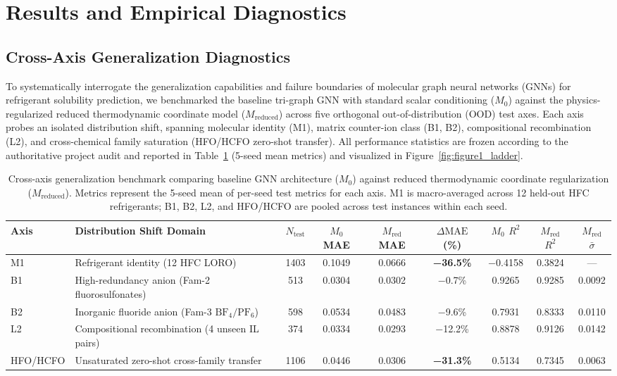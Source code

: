 \section{Results and Empirical Diagnostics}
\label{sec:results}

\subsection{Cross-Axis Generalization Diagnostics}
\label{subsec:cross_axis}

To systematically interrogate the generalization capabilities and failure boundaries of molecular graph neural networks (GNNs) for refrigerant solubility prediction, we benchmarked the baseline tri-graph GNN with standard scalar conditioning ($M_0$) against the physics-regularized reduced thermodynamic coordinate model ($M_{\mathrm{reduced}}$) across five orthogonal out-of-distribution (OOD) test axes. Each axis probes an isolated distribution shift, spanning molecular identity (M1), matrix counter-ion class (B1, B2), compositional recombination (L2), and cross-chemical family saturation (HFO/HCFO zero-shot transfer). All performance statistics are frozen according to the authoritative project audit and reported in Table~\ref{tab:cross_axis_master} (5-seed mean metrics) and visualized in Figure~\ref{fig:figure1_ladder}.

\begin{table}[htbp]
\centering
\small
\caption{Cross-axis generalization benchmark comparing baseline GNN architecture ($M_0$) against reduced thermodynamic coordinate regularization ($M_{\mathrm{reduced}}$). Metrics represent the 5-seed mean of per-seed test metrics for each axis. M1 is macro-averaged across 12 held-out HFC refrigerants; B1, B2, L2, and HFO/HCFO are pooled across test instances within each seed.}
\label{tab:cross_axis_master}
\begin{tabular}{llccccccc}
\toprule
\textbf{Axis} & \textbf{Distribution Shift Domain} & \textbf{$N_{\mathrm{test}}$} & \textbf{$M_0$ MAE} & \textbf{$M_{\mathrm{red}}$ MAE} & \textbf{$\Delta\text{MAE}$ (\%)} & \textbf{$M_0$ $R^2$} & \textbf{$M_{\mathrm{red}}$ $R^2$} & \textbf{$M_{\mathrm{red}}$ $\bar{\sigma}$} \\
\midrule
M1 & Refrigerant identity (12 HFC LORO) & 1403 & 0.1049 & 0.0666 & \textbf{−36.5\%} & −0.4158 & 0.3824 & — \\
B1 & High-redundancy anion (Fam-2 fluorosulfonates) & 513 & 0.0304 & 0.0302 & −0.7\% & 0.9265 & 0.9285 & 0.0092 \\
B2 & Inorganic fluoride anion (Fam-3 $\text{BF}_4/\text{PF}_6$) & 598 & 0.0534 & 0.0483 & −9.6\% & 0.7931 & 0.8333 & 0.0110 \\
L2 & Compositional recombination (4 unseen IL pairs) & 374 & 0.0334 & 0.0293 & −12.2\% & 0.8878 & 0.9126 & 0.0142 \\
HFO/HCFO & Unsaturated zero-shot cross-family transfer & 1106 & 0.0446 & 0.0306 & \textbf{−31.3\%} & 0.5134 & 0.7345 & 0.0063 \\
\bottomrule
\end{tabular}
\end{table}

